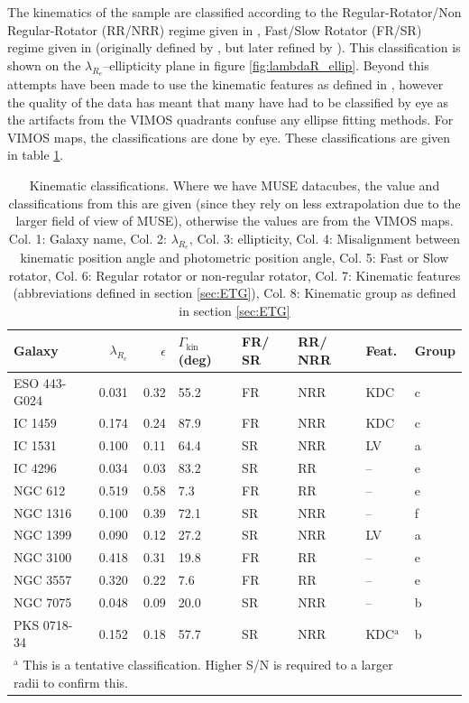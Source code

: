 		The kinematics of the sample are classified according to the Regular-Rotator/Non Regular-Rotator (RR/NRR) regime given in \citet{Krajnovic2011}, Fast/Slow Rotator (FR/SR) regime given in \citet{Cappellari2016} (originally defined by \citet{Emsellem2011}, but later refined by \citet{Cappellari2016}). This classification is shown on the $\lambda_{R_e}$--ellipticity plane in figure \ref{fig:lambdaR_ellip}. Beyond this attempts have been made to use the kinematic features as defined in \citet{Krajnovic2011}, however the quality of the data has meant that many have had to be classified by eye as the artifacts from the VIMOS quadrants confuse any ellipse fitting methods. For VIMOS maps, the classifications are done by eye. These classifications are given in table \ref{tab:classify}. 


		\begin{table}
			\centering
			\caption{Kinematic classifications. Where we have MUSE datacubes, the value and classifications from this are given (since they rely on less extrapolation due to the larger field of view of MUSE), otherwise the values are from the VIMOS maps. Col. 1: Galaxy name, Col. 2: $\lambda_{R_e}$, Col. 3: ellipticity, Col. 4: Misalignment between kinematic position angle and photometric position angle, Col. 5: Fast or Slow rotator, Col. 6: Regular rotator or non-regular rotator, Col. 7: Kinematic features (abbreviations defined in section \ref{sec:ETG}), Col. 8: Kinematic group as defined in section \ref{sec:ETG}}
			\label{tab:classify}
			\begin{tabular}{l r r p{0.7cm} l l l l}
				\hline
				\hline
				Galaxy		& $\lambda_{R_e}$ & $\epsilon$  & $\Gamma_\text{kin}$ (deg) & FR/ SR 	& RR/ NRR 	& Feat. & Group 	\\
				\hline 
				ESO 443-G024 & 0.031 & 0.32 & 55.2 	& FR & NRR & KDC & c \\
				IC 1459 	& 0.174 & 0.24 & 87.9	& FR & NRR & KDC & c \\
				IC 1531 	& 0.100 & 0.11 & 64.4 	& SR & NRR & LV & a \\
				IC 4296		& 0.034 & 0.03 & 83.2 	& SR & RR & -- & e \\
				NGC 612 	& 0.519 & 0.58 & 7.3 	& FR & RR & -- & e \\
				NGC 1316 	& 0.100 & 0.39 & 72.1 	& SR & NRR & -- & f \\
				NGC 1399 	& 0.090 & 0.12 & 27.2 	& SR & NRR & LV & a \\
				NGC 3100 	& 0.418 & 0.31 & 19.8 	& FR & RR & -- & e \\
				NGC 3557 	& 0.320 & 0.22 & 7.6 	& FR & RR & -- & e\\
				NGC 7075 	& 0.048 & 0.09 & 20.0 	& SR & NRR & -- & b \\
				PKS 0718-34 & 0.152 & 0.18 & 57.7 	& SR & NRR & KDC$^\text{a}$ & b\\
				\hline
				\hline
				\multicolumn{7}{L{.9\textwidth}}{\footnotesize $^\text{a}$ This is a tentative classification. Higher S/N is required to a larger radii to confirm this.} \\ %
			\end{tabular}
		\end{table}

